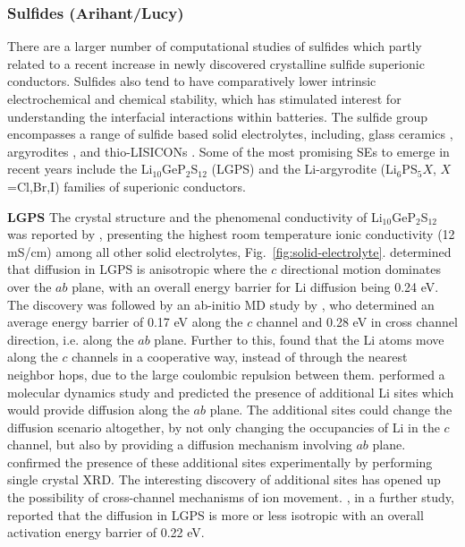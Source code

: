 \documentclass[../main.tex]{subfiles}
\begin{document}
\subsubsection{Sulfides (Arihant/Lucy)}
There are a larger number of computational studies of sulfides which partly related to a recent increase in newly discovered crystalline sulfide superionic conductors. Sulfides also tend to have comparatively lower intrinsic electrochemical and chemical stability, which has stimulated interest for understanding the interfacial interactions within batteries. \cite{Xiao2020interfacerev} The sulfide group encompasses a range of sulfide based solid electrolytes, including, glass ceramics \cite{minami2006recent}, argyrodites \cite{bai2020research}, and thio-LISICONs \cite{minafra2020two}. Some of the most promising SEs to emerge in recent years include the Li$_{10}$GeP$_2$S$_{12}$ (LGPS) \cite{Bhandari2016,Kamaya2011,Mo2012} and the Li-argyrodite (Li$_6$PS$_{5}X$, $X$=Cl,Br,I) \cite{kraft2018,deiseroth_li6ps5x_2008,deklerk2016,kraft2017,minafra2018,adeli2019} families of superionic conductors.

\textbf{LGPS}
The crystal structure and the phenomenal conductivity of Li$_{10}$GeP$_2$S$_{12}$ was reported by \citeauthor{Kamaya2011}, presenting the highest room temperature ionic conductivity (12 mS/cm) among all other solid electrolytes, Fig.~\ref{fig:solid-electrolyte}. \cite{Kamaya2011} \citeauthor{Kamaya2011} determined that diffusion in LGPS is anisotropic where the $c$ directional motion dominates over the $ab$ plane, with an overall energy barrier for Li diffusion being 0.24 eV. The discovery was followed by an ab-initio MD study by \citeauthor{Mo2012}, who determined an average energy barrier of 0.17 eV along the $c$ channel and 0.28 eV in cross channel direction, i.e. along the $ab$ plane.\cite{Mo2012} Further to this, \citeauthor{Xu2012one} found that the Li atoms move along the $c$ channels in a cooperative way, instead of through the nearest neighbor hops, due to the large coulombic repulsion between them.\cite{Xu2012one} \citeauthor{Adams2012} performed a molecular dynamics study and predicted the presence of additional Li sites which would provide diffusion along the $ab$ plane.\cite{Adams2012} The additional sites could change the diffusion scenario altogether, by not only changing the occupancies of Li in the $c$ channel, but also by providing a diffusion mechanism involving $ab$ plane. \citeauthor{Kuhn2013a} confirmed the presence of these additional sites experimentally by performing single crystal XRD.\cite{Kuhn2013a} The interesting discovery of additional sites has opened up the possibility of cross-channel mechanisms of ion movement. \citeauthor{Kuhn2013b}, in a further study, reported that the diffusion in LGPS is more or less isotropic with an overall activation energy barrier of 0.22 eV.\cite{Kuhn2013b}
\end{document}
